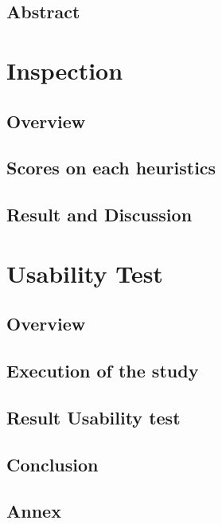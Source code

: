 \documentclass[fontsize=11pt,paper=a4,pagesize=auto]{report}
\begin{document}
\pagebreak
\tableofcontents
\chapter{Abstract}


\part{Inspection}

\chapter{Overview}
 

\chapter{Scores on each heuristics}



\chapter{Result and Discussion}



\part{Usability Test}

\chapter{Overview}


\chapter{Execution of the study}


\chapter{Result Usability test}


\chapter{Conclusion}


\appendix
\chapter{Annex}

\end{document}

